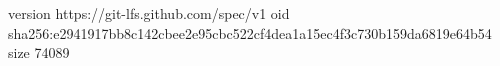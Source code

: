 version https://git-lfs.github.com/spec/v1
oid sha256:e2941917bb8c142cbee2e95cbc522cf4dea1a15ec4f3c730b159da6819e64b54
size 74089
